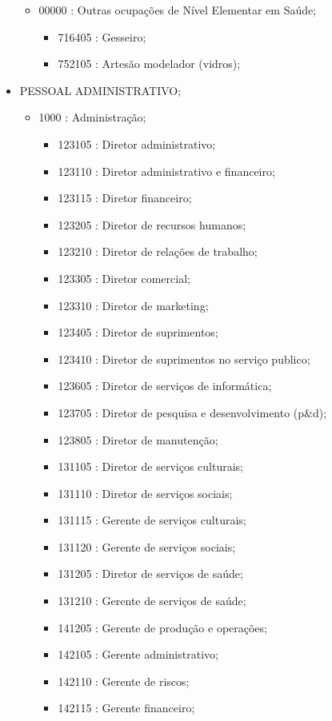 \begin{itemize}
\begin{itemize}
    \item 00000 : Outras ocupações de Nível Elementar em Saúde;
    \begin{itemize}
      \item 716405 : Gesseiro;
      \item 752105 : Artesão modelador (vidros);
    \end{itemize}
  \end{itemize}
  \item PESSOAL ADMINISTRATIVO;
  \begin{itemize}
    \item 1000 : Administração;
    \begin{itemize}
      \item 123105 : Diretor administrativo;
      \item 123110 : Diretor administrativo e financeiro;
      \item 123115 : Diretor financeiro;
      \item 123205 : Diretor de recursos humanos;
      \item 123210 : Diretor de relações de trabalho;
      \item 123305 : Diretor comercial;
      \item 123310 : Diretor de marketing;
      \item 123405 : Diretor de suprimentos;
      \item 123410 : Diretor de suprimentos no serviço publico;
      \item 123605 : Diretor de serviços de informática;
      \item 123705 : Diretor de pesquisa e desenvolvimento (p\&d);
      \item 123805 : Diretor de manutenção;
      \item 131105 : Diretor de serviços culturais;
      \item 131110 : Diretor de serviços sociais;
      \item 131115 : Gerente de serviços culturais;
      \item 131120 : Gerente de serviços sociais;
      \item 131205 : Diretor de serviços de saúde;
      \item 131210 : Gerente de serviços de saúde;
      \item 141205 : Gerente de produção e operações;
      \item 142105 : Gerente administrativo;
      \item 142110 : Gerente de riscos;
      \item 142115 : Gerente financeiro;

\end{itemize}
\end{itemize}
\end{itemize}
